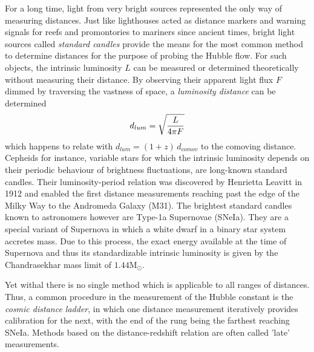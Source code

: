 For a long time, light from very bright sources represented the only way of
measuring distances.  Just like lighthouses acted as distance markers
and warning signals for reefs and promontories to mariners since ancient times,
bright light sources called \textit{standard candles} provide the means for the
most common method to determine distances for the purpose of probing the Hubble
flow.  For such objects, the intrinsic luminosity $L$ can be measured or
determined theoretically without measuring their distance.  By observing their
apparent light flux $F$ dimmed by traversing the vastness of space, a
\textit{luminosity distance} can be determined
%
\begin{equation}\eqlbl{d_lum}%
    d_{lum} = \sqrt{\frac{L}{4\pi F}}
\end{equation}%
%
which happens to relate with $d_{lum}={(1+z)\,d_{comov}}$ to the comoving
distance.  Cepheids for instance, variable stars for which the intrinsic
luminosity depends on their periodic behaviour of brightness fluctuations, are
long-known standard candles.  Their luminosity-period relation was discovered by
Henrietta Leavitt in 1912 and enabled the first distance measurements reaching
past the edge of the Milky Way to the Andromeda Galaxy (M31).  The brightest
standard candles known to astronomers however are Type-1a Supernovae (SNeIa).
They are a special variant of Supernova in which a white dwarf in a binary star
system accretes mass.  Due to this process, the exact energy available at the
time of Supernova and thus its standardizable intrinsic luminosity is given by
the Chandrasekhar mass limit of $1.44\mathrm{M_\odot}$.  

Yet withal there is no single method which is applicable to all ranges of
distances.  Thus, a common procedure in the measurement of the Hubble constant
is the \textit{cosmic distance ladder}, in which one distance measurement
iteratively provides calibration for the next, with the end of the rung being
the farthest reaching SNeIa.  Methods based on the distance-redshift relation
are often called 'late' measurements.

